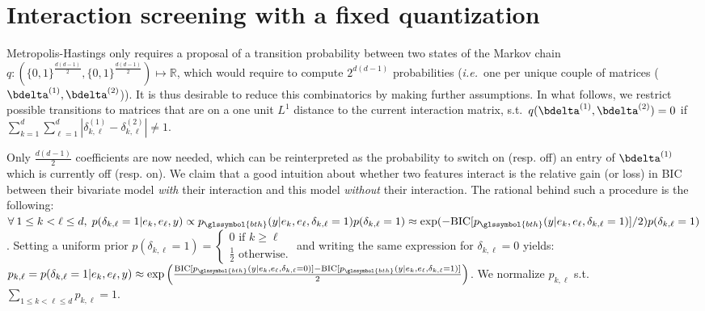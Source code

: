\section{Interaction screening with a fixed quantization}

Metropolis-Hastings only requires a proposal of a transition probability between two states of the Markov chain $q: ({\{0,1\}}^{\frac{d(d-1)}{2}},{\{0,1\}}^{\frac{d(d-1)}{2}}) \mapsto \mathbb{R}$, which would require to compute $2^{d(d-1)}$ probabilities (\textit{i.e.}\ one per unique couple of matrices ($\bdelta^{(1)},\bdelta^{(2)}$)). It is thus desirable to reduce this combinatorics by making further assumptions. In what follows, we restrict possible transitions to matrices that are on a one unit $L^1$ distance to the current interaction matrix, s.t.\ $q(\bdelta^{(1)},\bdelta^{(2)}) = 0$ if $\sum_{k=1}^d \sum_{\ell=1}^d |\delta^{(1)}_{k,\ell} - \delta^{(2)}_{k,\ell}| \neq 1$.

Only $\frac{d(d-1)}{2}$ coefficients are now needed, which can be reinterpreted as the probability to switch on (resp. off) an entry of $\bdelta^{(1)}$ which is currently off (resp. on). We claim that a good intuition about whether two features interact is the relative gain (or loss) in BIC between their bivariate model \textit{with} their interaction and this model \textit{without} their interaction. The rational behind such a procedure is the following: $\forall \: 1 \leq k < \ell \leq d, \; p(\delta_{k,\ell}=1 | e_k, e_{\ell}, y) \propto p_{\glssymbol{bth}}(y | e_k, e_{\ell}, \delta_{k,\ell}=1) p(\delta_{k,\ell}=1) \approx \exp(-\text{BIC}[p_{\glssymbol{bth}}(y | e_k, e_{\ell}, \delta_{k,\ell}=1)]/2) p(\delta_{k,\ell}=1)$. Setting a uniform prior $p(\delta_{k,\ell}=1) =\begin{cases} 0 \text{ if } k \geq \ell \\ \frac{1}{2} \text{ otherwise.} \end{cases}$ and writing the same expression for $\delta_{k,\ell} = 0$ yields: $p_{k,\ell} = p(\delta_{k,\ell}=1 | e_k, e_{\ell}, y) \approx \exp \left( \frac{\text{BIC}[p_{\glssymbol{bth}}(y | e_k, e_{\ell}, \delta_{k,\ell}=0)]-\text{BIC}[p_{\glssymbol{bth}}(y | e_k, e_{\ell}, \delta_{k,\ell}=1)]}{2} \right)$. We normalize $p_{k,\ell}$ s.t.\ $\sum_{1 \leq k < \ell \leq d} p_{k,\ell} = 1$.

